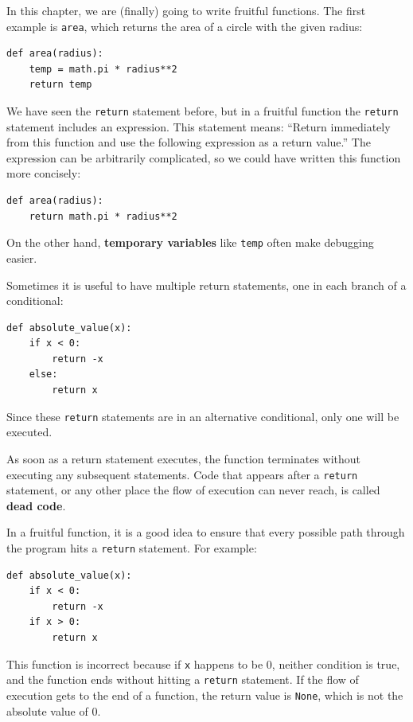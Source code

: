 \documentclass[10pt]{book}
\begin{document}
In this chapter, we are (finally) going to write fruitful functions.
The first example is {\tt area}, which returns the area of a circle
with the given radius:

\beforeverb
\begin{verbatim}
def area(radius):
    temp = math.pi * radius**2
    return temp
\end{verbatim}
\afterverb
%
We have seen the {\tt return} statement before, but in a fruitful
function the {\tt return} statement includes
an expression.  This statement means: ``Return immediately from
this function and use the following expression as a return value.''
The expression can be arbitrarily complicated, so we could
have written this function more concisely:


\beforeverb
\begin{verbatim}
def area(radius):
    return math.pi * radius**2
\end{verbatim}
\afterverb
%
On the other hand, {\bf temporary variables} like {\tt temp} often make
debugging easier.


Sometimes it is useful to have multiple return statements, one in each
branch of a conditional:

\beforeverb
\begin{verbatim}
def absolute_value(x):
    if x < 0:
        return -x
    else:
        return x
\end{verbatim}
\afterverb
%
Since these {\tt return} statements are in an alternative conditional,
only one will be executed.

As soon as a return statement executes, the function
terminates without executing any subsequent statements.
Code that appears after a {\tt return} statement, or any other place
the flow of execution can never reach, is called {\bf dead code}.


In a fruitful function, it is a good idea to ensure
that every possible path through the program hits a
{\tt return} statement.  For example:

\beforeverb
\begin{verbatim}
def absolute_value(x):
    if x < 0:
        return -x
    if x > 0:
        return x
\end{verbatim}
\afterverb
%
This function is incorrect because if {\tt x} happens to be 0,
neither condition is true, and the function ends without hitting a
{\tt return} statement.  If the flow of execution gets to the end
of a function, the return value is {\tt None}, which is not
the absolute value of 0.
\end{document}
